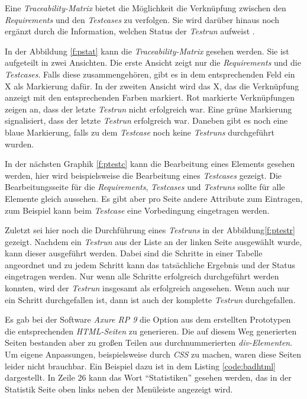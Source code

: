 \documentclass[11pt,a4paper]{report}
\begin{document}
Eine \textit{Traceability-Matrix} bietet die Möglichkeit die Verknüpfung zwischen den \textit{Requirements} und den \textit{Testcases} zu verfolgen. Sie wird darüber hinaus noch ergänzt durch die Information, welchen Status der \textit{Testrun} aufweist \cite{guru}.

In der Abbildung \ref{f:pstat} kann die \textit{Traceability-Matrix} gesehen werden. Sie ist aufgeteilt in zwei Ansichten. Die erste Ansicht zeigt nur die \textit{Requirements} und die \textit{Testcases}. Falls diese zusammengehören, gibt es in dem entsprechenden Feld ein X als Markierung dafür. In der zweiten Ansicht wird das X, das die Verknüpfung anzeigt mit den entsprechenden Farben markiert. Rot markierte Verknüpfungen zeigen an, dass der letzte \textit{Testrun} nicht erfolgreich war. Eine grüne Markierung signalisiert, dass der letzte \textit{Testrun} erfolgreich war. Daneben gibt es noch eine blaue Markierung, falls zu dem \textit{Testcase} noch keine \textit{Testruns} durchgeführt wurden.




In der nächsten Graphik \ref{f:ptestc} kann die Bearbeitung eines Elements gesehen werden, hier wird beispielsweise die Bearbeitung eines \textit{Testcases} gezeigt. Die Bearbeitungsseite für die \textit{Requirements}, \textit{Testcases} und \textit{Testruns} sollte für alle Elemente gleich aussehen. Es gibt aber pro Seite andere Attribute zum Eintragen, zum Beispiel kann beim \textit{Testcase} eine Vorbedingung eingetragen werden.


Zuletzt sei hier noch die Durchführung eines \textit{Testruns} in der Abbildung\ref{f:ptestr} gezeigt. Nachdem ein \textit{Testrun} aus der Liste an der linken Seite ausgewählt wurde, kann dieser ausgeführt werden. Dabei sind die Schritte in einer Tabelle angeordnet und zu jedem Schritt kann das tatsächliche Ergebnis und der Status eingetragen werden. Nur wenn alle Schritte erfolgreich durchgeführt werden konnten, wird der \textit{Testrun} insgesamt als erfolgreich angesehen. Wenn auch nur ein Schritt durchgefallen ist, dann ist auch der komplette \textit{Testrun} durchgefallen.


Es gab bei der Software \textit{Axure RP 9} die Option aus dem erstellten Prototypen die entsprechenden \textit{HTML-Seiten} zu generieren. Die auf diesem Weg generierten Seiten bestanden aber zu großen Teilen aus durchnummerierten \textit{div-Elementen}. Um eigene Anpassungen, beispielsweise durch \textit{CSS} zu machen, waren diese Seiten leider nicht brauchbar. Ein Beispiel dazu ist in dem Listing \ref{code:badhtml} dargestellt. In Zeile 26 kann das Wort "`Statistiken"' gesehen werden, das in der Statistik Seite oben links neben der Menüleiste angezeigt wird.
\end{document}
